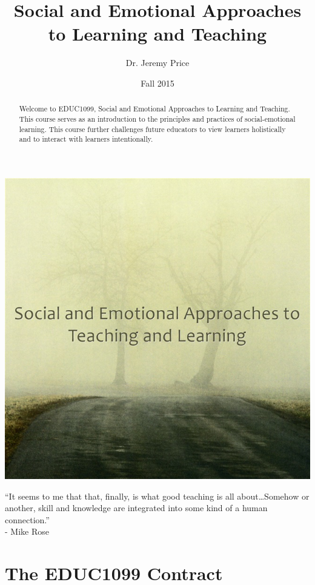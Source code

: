 \documentclass[two-side]{tufte-handout}
\title{Social and Emotional Approaches to Learning and Teaching}
\author{Dr. Jeremy Price}
\date{Fall 2015}  %
\begin{document}
\maketitle%

\begin{abstract}Welcome to EDUC1099, Social and Emotional Approaches to Learning and Teaching. This course serves as an introduction to the principles and practices of social-emotional learning. This course further challenges future educators to view learners holistically and to interact with learners intentionally.\end{abstract}

\bigskip

	\begin{center}
		\includegraphics[width=0.40\linewidth]{sealt-logo.jpg}

		\bigskip

		\Large
		\enquote{It seems to me that that, finally, is what good teaching is all about\ldots Somehow or another, skill and knowledge are integrated into some kind of a human connection.}\\- Mike Rose
		\normalsize
	\end{center}



\newpage

\part{The EDUC1099 Contract}

\begin{fullwidth}



\end{fullwidth}
\end{document}

